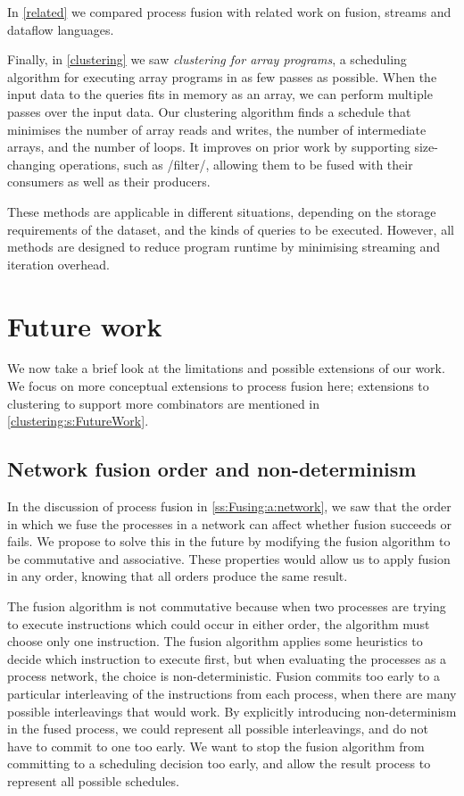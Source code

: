 In \cref{related} we compared process fusion with related work on fusion, streams and dataflow languages.

Finally, in \cref{clustering} we saw \emph{clustering for array programs}, a scheduling algorithm for executing array programs in as few passes as possible.
When the input data to the queries fits in memory as an array, we can perform multiple passes over the input data.
Our clustering algorithm finds a schedule that minimises the number of array reads and writes, the number of intermediate arrays, and the number of loops.
It improves on prior work by supporting size-changing operations, such as \Hs/filter/, allowing them to be fused with their consumers as well as their producers.

These methods are applicable in different situations, depending on the storage requirements of the dataset, and the kinds of queries to be executed.
However, all methods are designed to reduce program runtime by minimising streaming and iteration overhead.

\section{Future work}
\label{related/future}

We now take a brief look at the limitations and possible extensions of our work.
We focus on more conceptual extensions to process fusion here; extensions to clustering to support more combinators are mentioned in \cref{clustering:s:FutureWork}.

\subsection{Network fusion order and non-determinism}

In the discussion of process fusion in \cref{ss:Fusing:a:network}, we saw that the order in which we fuse the processes in a network can affect whether fusion succeeds or fails.
We propose to solve this in the future by modifying the fusion algorithm to be commutative and associative.
These properties would allow us to apply fusion in any order, knowing that all orders produce the same result.

The fusion algorithm is not commutative because when two processes are trying to execute instructions which could occur in either order, the algorithm must choose only one instruction.
The fusion algorithm applies some heuristics to decide which instruction to execute first, but when evaluating the processes as a process network, the choice is non-deterministic.
Fusion commits too early to a particular interleaving of the instructions from each process, when there are many possible interleavings that would work.
By explicitly introducing non-determinism in the fused process, we could represent all possible interleavings, and do not have to commit to one too early.
We want to stop the fusion algorithm from committing to a scheduling decision too early, and allow the result process to represent all possible schedules.

